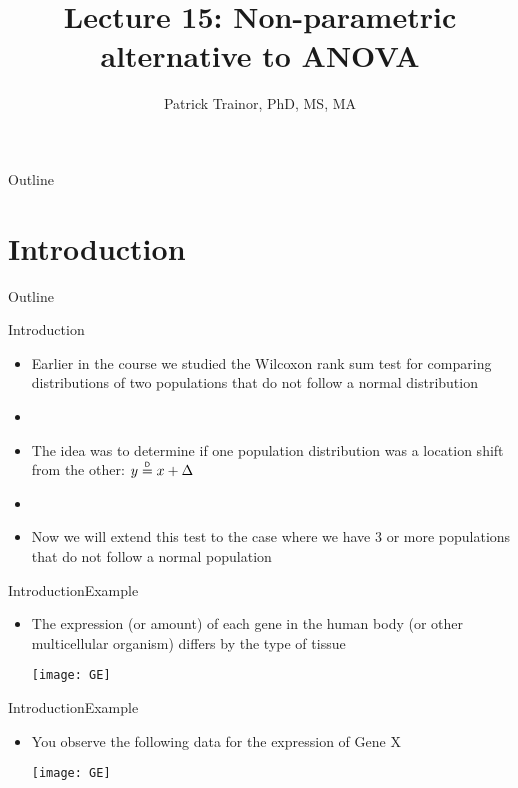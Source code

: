 \documentclass[xcolor=dvipsnames]{beamer}
\title[Lecture 15]{Lecture 15: Non-parametric alternative to ANOVA}
\author[Patrick Trainor]{Patrick Trainor, PhD, MS, MA}
\institute[NMSU]{New Mexico State University}
\date{}
\newcommand\myeq{\mathrel{\overset{\makebox[0pt]{\mbox{\normalfont\tiny\sffamily D}}}{=}}}
\begin{document}
	
\begin{frame}
	\maketitle
\end{frame}

\begin{frame}{Outline}
	\tableofcontents[hideallsubsections]
\end{frame}

\section{Introduction}

\begin{frame}{Outline}
	\tableofcontents[currentsection,subsectionstyle=show/shaded/hide]
\end{frame}

\begin{frame}{Introduction}
	\begin{itemize}
		\item Earlier in the course we studied the Wilcoxon rank sum test for comparing distributions of two populations that do not follow a normal distribution \pause
		\item[]
		\item The idea was to determine if one population distribution was a location shift from the other: $y \myeq x + \Delta$ \pause
		\item[]
		\item Now we will extend this test to the case where we have 3 or more populations that do not follow a normal population
	\end{itemize}
\end{frame}

\begin{frame}{Introduction}{Example}
	\begin{itemize}
		\item The expression (or amount) of each gene in the human body (or other multicellular organism) differs by the type of tissue 
		\begin{center}
			\texttt{[image: GE]}
		\end{center}
	\end{itemize}
\end{frame}

\begin{frame}{Introduction}{Example}
	\begin{itemize}
		\item You observe the following data for the expression of Gene X
		\begin{center}
			\texttt{[image: GE]}
		\end{center}
	\end{itemize}
\end{frame}
\end{document}
